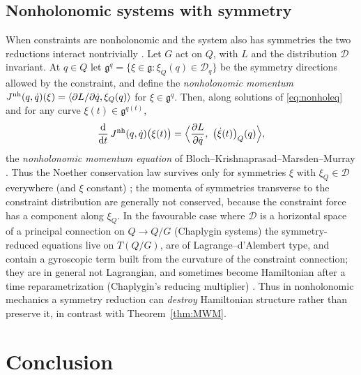 \documentclass[11pt,a4paper]{article}
\numberwithin{equation}{section}
\theoremstyle{plain}
\theoremstyle{definition}
\theoremstyle{remark}
\newcommand{\frakg}{\mathfrak{g}}
\newcommand{\pair}[2]{\langle #1,#2\rangle}
\newcommand{\dd}{\mathrm{d}}
\begin{document}
\subsection{Nonholonomic systems with symmetry}\label{sec:nonholsym}

When constraints are nonholonomic and the system also has symmetries the two reductions interact nontrivially \cite{bkmm1996,bloch2003,cortes2002,marle1995,bates1993}. Let $G$ act on $Q$, with $L$ and the distribution $\mathcal D$ invariant. At $q\in Q$ let $\frakg^q=\{\xi\in\frakg:\xi_Q(q)\in\mathcal D_q\}$ be the symmetry directions allowed by the constraint, and define the \emph{nonholonomic momentum} $J^{\rm nh}(q,\dot q)(\xi)=\pair{\partial L/\partial\dot q}{\xi_Q(q)}$ for $\xi\in\frakg^q$. Then, along solutions of \eqref{eq:nonholeq} and for any curve $\xi(t)\in\frakg^{q(t)}$,
\begin{equation}\label{eq:nhmom}
\frac{\dd}{\dd t}\,J^{\rm nh}(q,\dot q)\big(\xi(t)\big)=\Big\langle\frac{\partial L}{\partial\dot q},\ \big(\dot\xi(t)\big)_Q(q)\Big\rangle,
\end{equation}
the \emph{nonholonomic momentum equation} of Bloch--Krishnaprasad--Marsden--Murray \cite{bkmm1996}. Thus the Noether conservation law survives only for symmetries $\xi$ with $\xi_Q\in\mathcal D$ everywhere (and $\xi$ constant) \cite{bates1993,sniatycki1998}; the momenta of symmetries transverse to the constraint distribution are generally not conserved, because the constraint force has a component along $\xi_Q$. In the favourable case where $\mathcal D$ is a horizontal space of a principal connection on $Q\to Q/G$ (Chaplygin systems) the symmetry-reduced equations live on $T(Q/G)$, are of Lagrange--d'Alembert type, and contain a gyroscopic term built from the curvature of the constraint connection; they are in general not Lagrangian, and sometimes become Hamiltonian after a time reparametrization (Chaplygin's reducing multiplier) \cite{chaplygin1911,koiller1992,ehlers2005}. Thus in nonholonomic mechanics a symmetry reduction can \emph{destroy} Hamiltonian structure rather than preserve it, in contrast with Theorem~\ref{thm:MWM}.

\section{Conclusion}\label{sec:conclusion}
\end{document}
